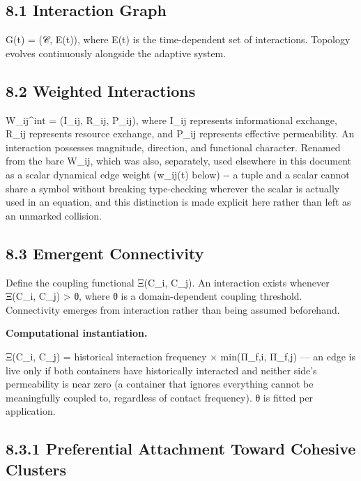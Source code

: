 \documentclass[
]{article}
\begin{document}
\hypertarget{interaction-graph}{%
\subsection{8.1 Interaction Graph}\label{interaction-graph}}

G(t) = (𝒞, E(t)), where E(t) is the time-dependent set of interactions.
Topology evolves continuously alongside the adaptive system.

\hypertarget{weighted-interactions}{%
\subsection{8.2 Weighted Interactions}\label{weighted-interactions}}

W\_ij\^{}int = (I\_ij, R\_ij, P\_ij), where I\_ij represents
informational exchange, R\_ij represents resource exchange, and P\_ij
represents effective permeability. An interaction possesses magnitude,
direction, and functional character. Renamed from the bare W\_ij, which
was also, separately, used elsewhere in this document as a scalar
dynamical edge weight (w\_ij(t) below) -\/- a tuple and a scalar cannot
share a symbol without breaking type-checking wherever the scalar is
actually used in an equation, and this distinction is made explicit here
rather than left as an unmarked collision.

\hypertarget{emergent-connectivity}{%
\subsection{8.3 Emergent Connectivity}\label{emergent-connectivity}}

Define the coupling functional Ξ(C\_i, C\_j). An interaction exists
whenever Ξ(C\_i, C\_j) \textgreater{} θ, where θ is a domain-dependent
coupling threshold. Connectivity emerges from interaction rather than
being assumed beforehand.

\textbf{Computational instantiation.}

Ξ(C\_i, C\_j) = historical interaction frequency × min(Π\_f,i, Π\_f,j)
--- an edge is live only if both containers have historically interacted
and neither side's permeability is near zero (a container that ignores
everything cannot be meaningfully coupled to, regardless of contact
frequency). θ is fitted per application.

\hypertarget{preferential-attachment-toward-cohesive-clusters}{%
\subsection{8.3.1 Preferential Attachment Toward Cohesive
Clusters}\label{preferential-attachment-toward-cohesive-clusters}}
\end{document}
